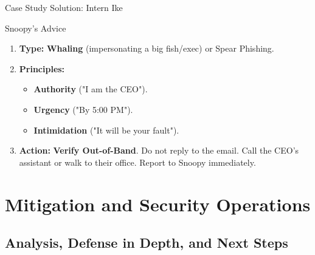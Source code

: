 \documentclass[aspectratio=169]{beamer}  %
\begin{document}
\begin{frame}{Case Study Solution: Intern Ike}
    \begin{exampleblock}{Snoopy's Advice}
        \footnotesize
        \begin{enumerate}
            \item \textbf{Type:} \textbf{Whaling} (impersonating a big fish/exec) or Spear Phishing.
            \item \textbf{Principles:} 
            \begin{itemize}
                \item \textbf{Authority} ("I am the CEO").
                \item \textbf{Urgency} ("By 5:00 PM").
                \item \textbf{Intimidation} ("It will be your fault").
            \end{itemize}
            \item \textbf{Action:} \textbf{Verify Out-of-Band}. Do not reply to the email. Call the CEO's assistant or walk to their office. Report to Snoopy immediately.
        \end{enumerate}
    \end{exampleblock}
\end{frame}

\section{Mitigation and Security Operations}
\subsection{Analysis, Defense in Depth, and Next Steps}

\end{document}
